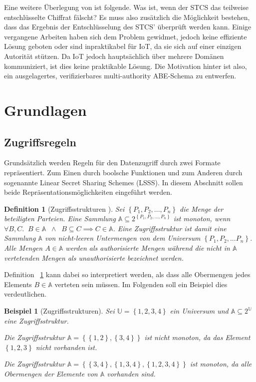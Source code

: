 \documentclass{hsflensburg}
\newtheorem{definition}{Definition}
\newtheorem*{example}{Beispiel}
\begin{document}
	Eine weitere Überlegung von \cite{phoabe} ist folgende. Was ist, wenn der STCS
	das teilweise entschlüsselte Chiffrat fälscht? Es muss also zusätzlich die
	Möglichkeit bestehen, dass das Ergebnis der Entschlüsselung des STCS'
	überprüft werden kann. Einige vergangene Arbeiten haben sich dem Problem
	gewidmet, jedoch keine effiziente Lösung geboten oder sind inpraktikabel für
	IoT, da sie sich auf einer einzigen Autorität stützen. Da IoT jedoch
	hauptsächlich über mehrere Domänen kommuniziert, ist dies keine praktikable
	Lösung. Die Motivation hinter \cite{phoabe} ist also, ein ausgelagertes,
	verifizierbares multi-authority ABE-Schema zu entwerfen.
	
	\section{Grundlagen}
	\subsection{Zugriffsregeln}
	Grundsätzlich werden Regeln für den Datenzugriff durch zwei Formate
	repräsentiert. Zum Einen durch boolsche Funktionen und zum Anderen durch
	sogenannte Linear Secret Sharing Schemes (LSSS). In diesem Abschnitt sollen
	beide Repräsentationsmöglichkeiten eingeführt werden.

	\begin{definition}[Zugriffsstrukturen \cite{abe}]\label{def:access-structures}
		Sei $\left\{ P_1, P_2, ..., P_n \right\}$ die Menge der beteiligten
		Parteien. Eine Sammlung $\mathbb{A} \subseteq 2^{\left\{ P_1, P_2, ..., P_n
		\right\}}$ ist monoton, wenn $\forall B, C .\;\; B \in \mathbb{A}
		\;\;\land\;\; B \subseteq C \implies C \in \mathbb{A}$. Eine
		Zugriffsstruktur ist damit eine Sammlung $\mathbb{A}$ von nicht-leeren
		Untermengen von dem Universum $\left\{ P_1, P_2, ... P_n \right\}$. Alle
		Mengen $A \in \mathbb{A}$ werden als authorisierte Mengen während
		die nicht in $\mathbb{A}$ vertetenden Mengen als unauthorisierte
		bezeichnet werden.
	\end{definition}

	Definition ~\ref{def:access-structures} kann dabei so interpretiert werden,
	als dass alle Obermengen jedes Elements $B \in \mathbb{A}$ verteten sein
	müssen. Im Folgenden soll ein Beispiel dies verdeutlichen.

	\begin{example}[Zugriffsstrukturen]
		Sei $\mathbb{U} = \left\{ 1, 2, 3, 4 \right\}$ ein Universum und $\mathbb{A}
		\subseteq 2^\mathbb{U}$ eine Zugriffsstruktur.

		Die Zugriffsstruktur $\mathbb{A} = \left\{ \left\{1,2\right\},
		\left\{3,4\right\} \right\}$ ist nicht monoton, da das Element
		$\left\{1,2,3\right\}$ nicht vorhanden ist.

		Die Zugriffsstruktur $\mathbb{A} = \left\{ \left\{3,4\right\},
		\left\{1,3,4\right\}, \left\{1,2,3,4\right\} \right\}$ ist monoton, da alle
		Obermengen der Elemente von $\mathbb{A}$ vorhanden sind.
	\end{example}
\end{document}
